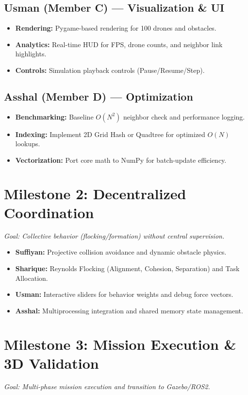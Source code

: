 \documentclass[11pt,a4paper]{article}
\begin{document}
\subsection{Usman (Member C) --- Visualization \& UI}
\begin{itemize}[noitemsep]
    \item \textbf{Rendering:} Pygame-based rendering for 100 drones and obstacles.
    \item \textbf{Analytics:} Real-time HUD for FPS, drone counts, and neighbor link highlights.
    \item \textbf{Controls:} Simulation playback controls (Pause/Resume/Step).
\end{itemize}

\subsection{Asshal (Member D) --- Optimization}
\begin{itemize}[noitemsep]
    \item \textbf{Benchmarking:} Baseline $O(N^2)$ neighbor check and performance logging.
    \item \textbf{Indexing:} Implement 2D Grid Hash or Quadtree for optimized $O(N)$ lookups.
    \item \textbf{Vectorization:} Port core math to NumPy for batch-update efficiency.
\end{itemize}

\section{Milestone 2: Decentralized Coordination}
\textit{Goal: Collective behavior (flocking/formation) without central supervision.}

\begin{itemize}
    \item \textbf{Suffiyan:} Projective collision avoidance and dynamic obstacle physics.
    \item \textbf{Sharique:} Reynolds Flocking (Alignment, Cohesion, Separation) and Task Allocation.
    \item \textbf{Usman:} Interactive sliders for behavior weights and debug force vectors.
    \item \textbf{Asshal:} Multiprocessing integration and shared memory state management.
\end{itemize}

\section{Milestone 3: Mission Execution \& 3D Validation}
\textit{Goal: Multi-phase mission execution and transition to Gazebo/ROS2.}
\end{document}
